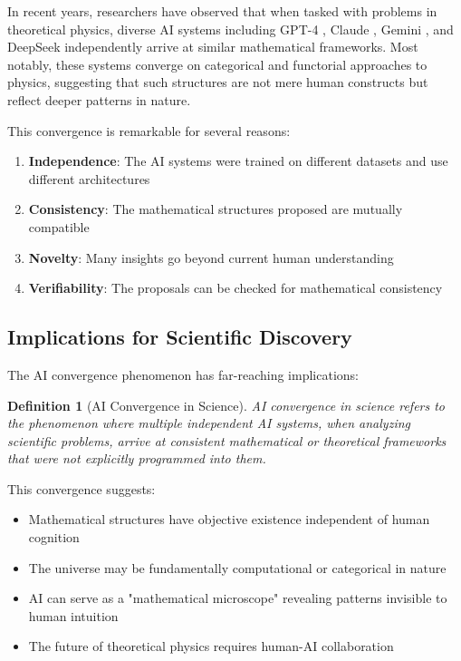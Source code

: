 \documentclass[11pt,a4paper]{article}
\newtheorem{definition}[theorem]{Definition}
\begin{document}
In recent years, researchers have observed that when tasked with problems in theoretical physics, diverse AI systems including GPT-4 \citep{openai2023gpt4}, Claude \citep{anthropic2024claude}, Gemini \citep{google2023gemini}, and DeepSeek \citep{deepseek2024technical} independently arrive at similar mathematical frameworks. Most notably, these systems converge on categorical and functorial approaches to physics, suggesting that such structures are not mere human constructs but reflect deeper patterns in nature.

This convergence is remarkable for several reasons:
\begin{enumerate}
    \item \textbf{Independence}: The AI systems were trained on different datasets and use different architectures
    \item \textbf{Consistency}: The mathematical structures proposed are mutually compatible
    \item \textbf{Novelty}: Many insights go beyond current human understanding
    \item \textbf{Verifiability}: The proposals can be checked for mathematical consistency
\end{enumerate}

\subsection{Implications for Scientific Discovery}

The AI convergence phenomenon has far-reaching implications:

\begin{definition}[AI Convergence in Science]
AI convergence in science refers to the phenomenon where multiple independent AI systems, when analyzing scientific problems, arrive at consistent mathematical or theoretical frameworks that were not explicitly programmed into them.
\end{definition}

This convergence suggests:
\begin{itemize}
    \item Mathematical structures have objective existence independent of human cognition
    \item The universe may be fundamentally computational or categorical in nature
    \item AI can serve as a "mathematical microscope" revealing patterns invisible to human intuition
    \item The future of theoretical physics requires human-AI collaboration
\end{itemize}
\end{document}
